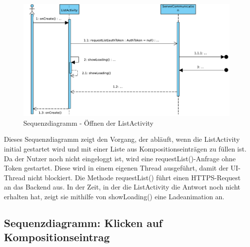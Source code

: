 \begin{figure}[h]
	\centering
	\includegraphics[width=\textwidth]{img/Diagramme/Sequenz/App_list}
	\caption{Sequenzdiagramm - Öffnen der ListActivity}
	\label{fig:sequenz-app_list}
\end{figure}
\noindent
Dieses Sequenzdiagramm zeigt den Vorgang, der abläuft, wenn die ListActivity initial gestartet wird und mit einer Liste aus Kompositionseinträgen zu füllen ist.
Da der Nutzer noch nicht eingeloggt ist, wird eine requestList()-Anfrage ohne Token gestartet. Diese wird in einem eigenen Thread ausgeführt, damit der UI-Thread nicht blockiert. Die Methode requestList() führt einen HTTPS-Request an das Backend aus. In der Zeit, in der die ListActivity die Antwort noch nicht erhalten hat, zeigt sie mithilfe von showLoading() eine Ladeanimation an.

\subsection*{Sequenzdiagramm: Klicken auf Kompositionseintrag}

